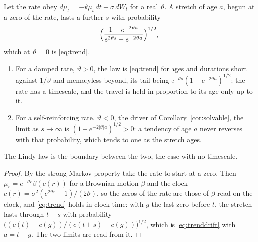 \begin{corollary}\label{cor:trenddrift}
Let the rate obey $d\mu_t=-\vartheta\mu_t\,dt+\sigma\,dW_t$ for a real
$\vartheta$. A stretch of age $a$, begun at a zero of the rate, lasts a
further $s$ with probability
\begin{equation}\label{eq:trenddrift}
\Bigl(\frac{1-e^{-2\vartheta a}}{e^{2\vartheta s}-e^{-2\vartheta a}}\Bigr)^{1/2},
\end{equation}
which at $\vartheta=0$ is \eqref{eq:trend}.
\begin{enumerate}[label=\emph{(\roman*)},itemsep=1pt]
\item For a damped rate, $\vartheta>0$, the law is \eqref{eq:trend} for
ages and durations short against $1/\vartheta$ and memoryless beyond, its
tail being $e^{-\vartheta s}(1-e^{-2\vartheta a})^{1/2}$: the rate has a
timescale, and the travel is held in proportion to its age only up to it.
\item For a self-reinforcing rate, $\vartheta<0$, the driver of
Corollary~\ref{cor:solvable}, the limit as $s\to\infty$ is
$(1-e^{-2|\vartheta|a})^{1/2}>0$: a tendency of age $a$ never reverses
with that probability, which tends to one as the stretch ages.
\end{enumerate}
The Lindy law is the boundary between the two, the case with no
timescale.
\end{corollary}

\begin{proof}
By the strong Markov property take the rate to start at a zero. Then
$\mu_r=e^{-\vartheta r}\beta(c(r))$ for a Brownian motion $\beta$ and the
clock $c(r)=\sigma^2(e^{2\vartheta r}-1)/(2\vartheta)$, so the zeros of
the rate are those of $\beta$ read on the clock, and \eqref{eq:trend}
holds in clock time: with $g$ the last zero before $t$, the stretch lasts
through $t+s$ with probability
$\bigl((c(t)-c(g))/(c(t+s)-c(g))\bigr)^{1/2}$, which is
\eqref{eq:trenddrift} with $a=t-g$. The two limits are read from it.
\end{proof}

